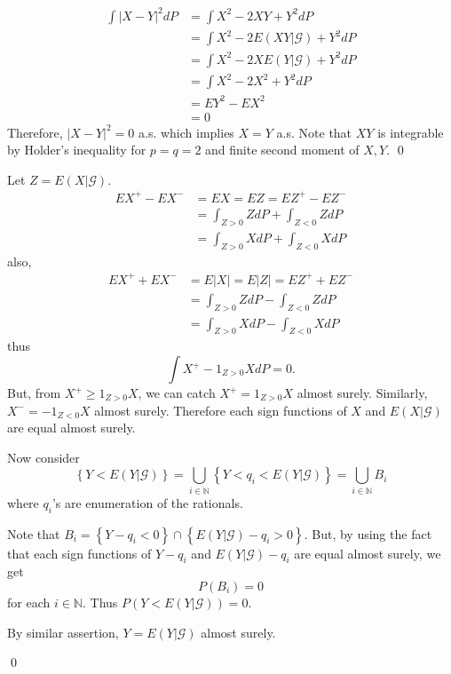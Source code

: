 \begin{problem}[4.1.9] \hfill
\[
	\begin{split}
		\int |X-Y|^2 dP
		& = \int X^2 - 2XY + Y^2 dP \\
		& = \int X^2 - 2E(XY | \mathcal{G}) +Y^2 dP \\
		& = \int X^2 -2X E(Y|\mathcal{G}) +Y^2 dP \\
		& = \int X^2 - 2X^2 + Y^2 dP \\
		& = EY^2 - EX^2 \\
		& = 0
	\end{split}
\]
Therefore, $|X-Y|^2 = 0$ a.s. which implies $X = Y$ a.s.
Note that $XY$ is integrable by Holder's inequality for $p = q = 2$ and finite second moment of $X, Y$.
\qed
\end{problem}

\begin{problem}[4.1.10]\hfill

	Let $Z= E(X |\mathcal{G})$.
	\[
		\begin{split}
			EX^+ - EX^- & = EX = EZ = EZ^+ - EZ^- \\
			& = \int_{Z>0}Z dP + \int_{Z<0} ZdP \\
			& = \int_{Z>0}X dP + \int_{Z<0} XdP
		\end{split}
	\]
	also,
	\[
		\begin{split}
			EX^+ +EX^- & = E|X| = E|Z| = EZ^+ +EZ^- \\
			& = \int_{Z>0}Z dP - \int_{Z<0}Z dP \\
			& = \int_{Z>0}X dP - \int_{Z<0}X dP
		\end{split}
	\]
	thus
	\[
		\int X^+ -1_{Z>0}X dP = 0.
	\]
	But, from $X^+ \geq 1_{Z>0}X$, we can catch $X^+ = 1_{Z>0}X$ almost surely.
	Similarly, $X^- = -1_{Z<0}X$ almost surely.
	Therefore each sign functions of $X$ and $E(X|\mathcal{G})$ are equal almost surely.
	
	Now consider
	\[
		\left\{ Y < E(Y |\mathcal{G}) \right\} = \bigcup_{i\in \mathbb{N}}\left\{ Y < q_i < E(Y|\mathcal{G}) \right\}
			= \bigcup_{i\in \mathbb{N}}B_i
	\]
	where $q_i$'s are enumeration of the rationals.

	Note that $B_i = \left\{ Y - q_i <0 \right\} \cap \left\{ E(Y|\mathcal{G}) - q_i > 0 \right\}$.
	But, by using the fact that each sign functions of $Y - q_i$ and $E(Y|\mathcal{G}) - q_i$ are equal almost surely,
	we get
	\[
		P(B_i) = 0
	\]
	for each $i\in \mathbb{N}$.
	Thus $P(Y <E(Y|\mathcal{G}) ) = 0$.

	By similar assertion, $Y = E(Y|\mathcal{G})$ almost surely.

	\qed
\end{problem}
